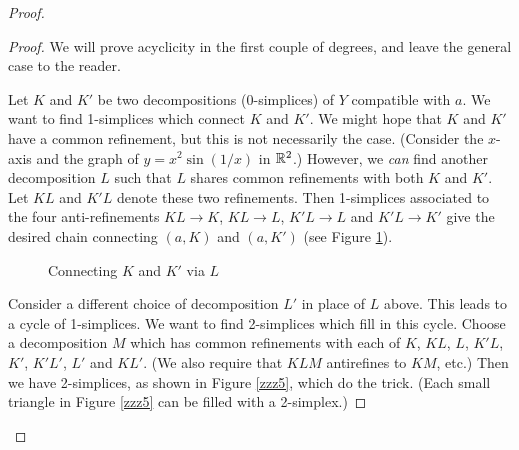 \begin{proof}
\begin{proof}
We will prove acyclicity in the first couple of degrees, and 
leave the general case to the reader.

Let $K$ and $K'$ be two decompositions (0-simplices) of $Y$ compatible with $a$.
We want to find 1-simplices which connect $K$ and $K'$.
We might hope that $K$ and $K'$ have a common refinement, but this is not necessarily
the case.
(Consider the $x$-axis and the graph of $y = x^2\sin(1/x)$ in $\mathbb{R}^2$.) 
However, we {\it can} find another decomposition $L$ such that $L$ shares common
refinements with both $K$ and $K'$.
Let $KL$ and $K'L$ denote these two refinements.
Then 1-simplices associated to the four anti-refinements
$KL\to K$, $KL\to L$, $K'L\to L$ and $K'L\to K'$
give the desired chain connecting $(a, K)$ and $(a, K')$
(see Figure \ref{zzz4}).

\begin{figure}[t] \centering
{}
\caption{Connecting $K$ and $K'$ via $L$}
\label{zzz4}
\end{figure}

Consider a different choice of decomposition $L'$ in place of $L$ above.
This leads to a cycle of 1-simplices.
We want to find 2-simplices which fill in this cycle.
Choose a decomposition $M$ which has common refinements with each of 
$K$, $KL$, $L$, $K'L$, $K'$, $K'L'$, $L'$ and $KL'$.
(We also require that $KLM$ antirefines to $KM$, etc.)
Then we have 2-simplices, as shown in Figure \ref{zzz5}, which do the trick.
(Each small triangle in Figure \ref{zzz5} can be filled with a 2-simplex.)


\end{proof}
\end{proof}
